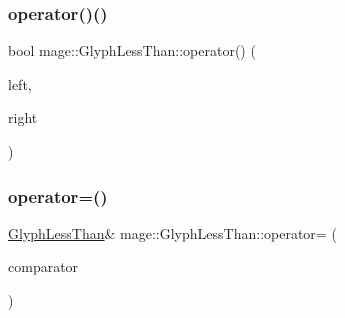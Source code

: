 \subsubsection{\texorpdfstring{operator()()}{operator()()}\hspace{0.1cm}{\footnotesize\ttfamily [3/3]}}
{\footnotesize\ttfamily bool mage\+::\+Glyph\+Less\+Than\+::operator() (\begin{DoxyParamCaption}\item[{wchar\+\_\+t}]{left,  }\item[{const \hyperlink{structmage_1_1_glyph}{Glyph} \&}]{right }\end{DoxyParamCaption})}

\hypertarget{structmage_1_1_glyph_less_than_aa3de6a126c3a70ad452a17b37709eca6}{}\label{structmage_1_1_glyph_less_than_aa3de6a126c3a70ad452a17b37709eca6} 
\subsubsection{\texorpdfstring{operator=()}{operator=()}}
{\footnotesize\ttfamily \hyperlink{structmage_1_1_glyph_less_than}{Glyph\+Less\+Than}\& mage\+::\+Glyph\+Less\+Than\+::operator= (\begin{DoxyParamCaption}\item[{const \hyperlink{structmage_1_1_glyph_less_than}{Glyph\+Less\+Than} \&}]{comparator }\end{DoxyParamCaption})\hspace{0.3cm}{\ttfamily [default]}}

